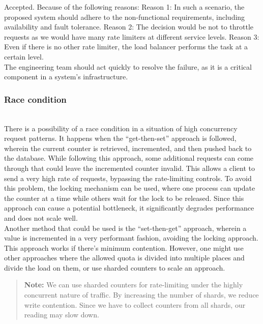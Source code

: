 Accepted. Because of the following reasons: Reason 1: In such a scenario, the proposed system should adhere to the non-functional requirements, including availability and fault tolerance. Reason 2: The decision would be not to throttle requests as we would have many rate limiters at different service levels. Reason
3: Even if there is no other rate limiter, the load balancer performs the task at a certain level.
\\
The engineering team should act quickly to resolve the failure, as it is a critical component in a system's infrastructure.

\subsubsection{Race condition}\label{TklBDgZ5IQh16oZ2EyK8T}
\\
There is a possibility of a race condition in a situation of high concurrency request patterns. It happens when the ``get-then-set'' approach is followed, wherein the current counter is retrieved, incremented, and then pushed back to the database. While following this approach, some additional requests can come through that could leave the incremented counter invalid. This allows a client to send a very high rate of requests, bypassing the rate-limiting controls. To avoid this problem, the locking mechanism can be used, where one process can update the counter at a time while others wait for the lock to be released. Since this approach can cause a potential bottleneck, it significantly degrades performance and does not scale well.
\\
Another method that could be used is the ``set-then-get'' approach, wherein a value is incremented in a very performant fashion, avoiding the locking approach. This approach works if there's minimum contention. However, one might use other approaches where the allowed quota is divided into multiple places and divide the load on them, or use sharded counters to scale an approach.
\begin{quote}
\textbf{Note:} We can use sharded counters for rate-limiting under the highly concurrent nature of traffic. By increasing the number of shards, we reduce write contention. Since we have to collect counters from all shards, our reading may slow down.
\end{quote}
